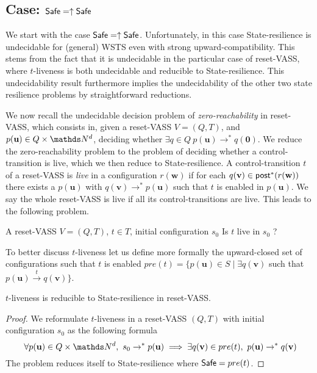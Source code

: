 \subsection{Case: $\textsf{Safe} = \uparrow \textsf{Safe}$%
}

We start with the case $\textsf{Safe} = \uparrow \textsf{Safe}$.
%
Unfortunately, in this case {\sc State-resilience} is undecidable for (general) WSTS even with strong upward-compatibility.
This stems from the fact that it is undecidable in the particular case of reset-VASS,
where  $t$-liveness is both undecidable and 
 reducible to {\sc State-resilience}. This undecidability result furthermore implies the undecidability of the other two state resilience problems by straightforward reductions.

We now recall the
 undecidable \cite{araki1976PN} decision problem of {\em zero-reachability} in reset-VASS, which consists in, given a
reset-VASS $V=(Q,T)$, and $p(\textbf{u}) \in Q \times \N^d$,
deciding whether $\exists q \in Q ~ p(\textbf{u}) \to^* q(\textbf{0})$.
%
We reduce the zero-reachability problem to the problem of deciding whether a control-transition is live,
which we then reduce to {\sc State-resilience}.
A control-transition $t$ of a reset-VASS is {\em live} in a configuration $r(\textbf{w})$ if for each $q(\textbf{v}) \in \textsf{post}^*(r(\textbf{w}))$ there exists a 
 $p(\textbf{u})$ with $q(\textbf{v}) \to^* p(\textbf{u})$ such that $t$ is enabled in $p(\textbf{u})$. We say the whole reset-VASS is live if all its control-transitions are
live. This leads to the following problem.

{A reset-VASS $V=(Q,T)$, $t \in T$, initial configuration $s_0$}
{Is $t$ live in $s_0$ ? \\}


To better discuss $t$-liveness let us define more formally the upward-closed set of configurations such that $t$ is enabled
$pre(t)=\{ p(\textbf{u}) \in S \mid \exists q(\textbf{v})$ such that $ p(\textbf{u}) \xrightarrow{t} q(\textbf{v}) \}$.



\begin{proposition}\label{reductions}
{\sc $t$-liveness} is reducible to {\sc State-resilience} in reset-VASS.
\end{proposition}


\begin{proof}
We reformulate $t$-liveness 
in a 
reset-VASS $(Q,T)$ 
with initial configuration $s_0$
as the following formula
\[ ~ \forall p(\textbf{u}) \in Q \times \N^d, 
~ s_0 \rightarrow^* p(\textbf{u}) \implies \exists q(\textbf{v}) \in pre(t), ~ p(\textbf{u}) \rightarrow^{*} q(\textbf{v})\]  
The problem reduces itself to {\sc State-resilience}
where $\textsf{Safe} = pre(t)$.
\end{proof}



